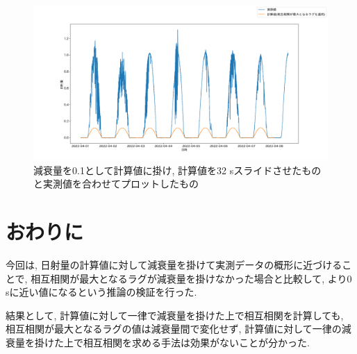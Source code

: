 \documentclass[a4j,12pt,]{jarticle}
\begin{document}
\begin{figure}[H]
  \begin{center}
    \includegraphics[width=160mm]{0.1.png}
    \caption{減衰量を0.1として計算値に掛け, 計算値を32 \si{\second}スライドさせたものと実測値を合わせてプロットしたもの}
    \label{p6}
  \end{center}
\end{figure}

\section{おわりに}
今回は, 日射量の計算値に対して減衰量を掛けて実測データの概形に近づけることで, 相互相関が最大となるラグが減衰量を掛けなかった場合と比較して, より0 \si{\second}に近い値になるという推論の検証を行った.

結果として, 計算値に対して一律で減衰量を掛けた上で相互相関を計算しても, 相互相関が最大となるラグの値は減衰量間で変化せず, 計算値に対して一律の減衰量を掛けた上で相互相関を求める手法は効果がないことが分かった.
\end{document}
